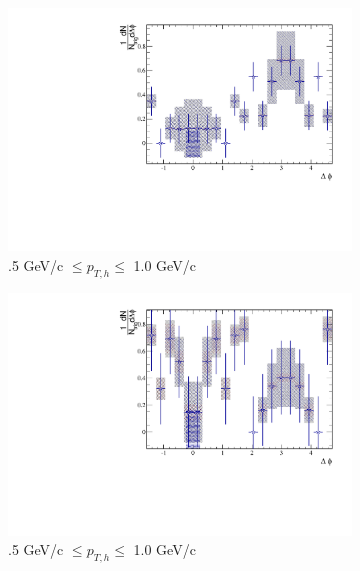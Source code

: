 \begin{figure}[htbp]
	\begin{subfigure}{0.5\textwidth}
		\includegraphics[width=\textwidth]{Plots/Correlations/subtracted/NPE_eh_corr_subtracted_primpt_4_5_cent_4_5_assopt_1_1.pdf}
		\caption{.5 GeV/c $\leq p_{T,h} \leq$ 1.0 GeV/c}
		\label{fig:Sub2040a}
	\end{subfigure}	
	\begin{subfigure}{0.5\textwidth}
		\includegraphics[width=\textwidth]{Plots/Correlations/subtracted/NPE_eh_corr_subtracted_primpt_6_8_cent_4_5_assopt_1_1.pdf}
		\caption{.5 GeV/c $\leq p_{T,h} \leq$ 1.0 GeV/c}
		\label{fig:Sub2040b}
	\end{subfigure}	
	\begin{subfigure}{0.5\textwidth}

\end{subfigure}
\end{figure}
